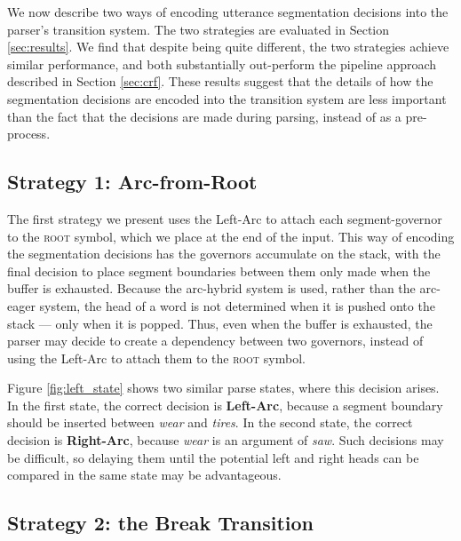 \documentclass[11pt,letterpaper]{article}
\begin{document}
We now describe two ways of encoding utterance segmentation decisions into the
parser's transition system. 
The two strategies are evaluated in Section \ref{sec:results}.
We find that despite being quite different, the two strategies achieve similar
performance, and both substantially out-perform the pipeline approach described
in Section \ref{sec:crf}.  These results suggest that the details of how the
segmentation decisions are encoded into the transition system are less
important than the fact that the decisions are made during parsing, instead of
as a pre-process.

\subsection{Strategy 1: Arc-from-Root}

The first strategy we present uses the Left-Arc to attach each segment-governor
to the \textsc{root} symbol, which we place at the end of the input.
This way of encoding the segmentation decisions has the governors accumulate on
the stack, with the final decision to place segment boundaries between them only
made when the buffer is exhausted.  Because the arc-hybrid system is used, rather
than the arc-eager system, the head of a word is not determined when it is pushed
onto the stack --- only when it is popped.  Thus, even when the buffer is exhausted,
the parser may decide to create a dependency between two governors, instead of
using the Left-Arc to attach them to the \textsc{root} symbol.

Figure \ref{fig:left_state} shows two similar parse states, where this decision
arises.  In the first state, the correct decision is \textbf{Left-Arc}, because
a segment boundary should be inserted between \emph{wear} and \emph{tires}.
In the second state, the correct decision is \textbf{Right-Arc}, because
\emph{wear} is an argument of \emph{saw}.  Such decisions may be difficult,
so delaying them until the potential left and right heads can be compared in the
same state may be advantageous.

\subsection{Strategy 2: the Break Transition}
\end{document}
